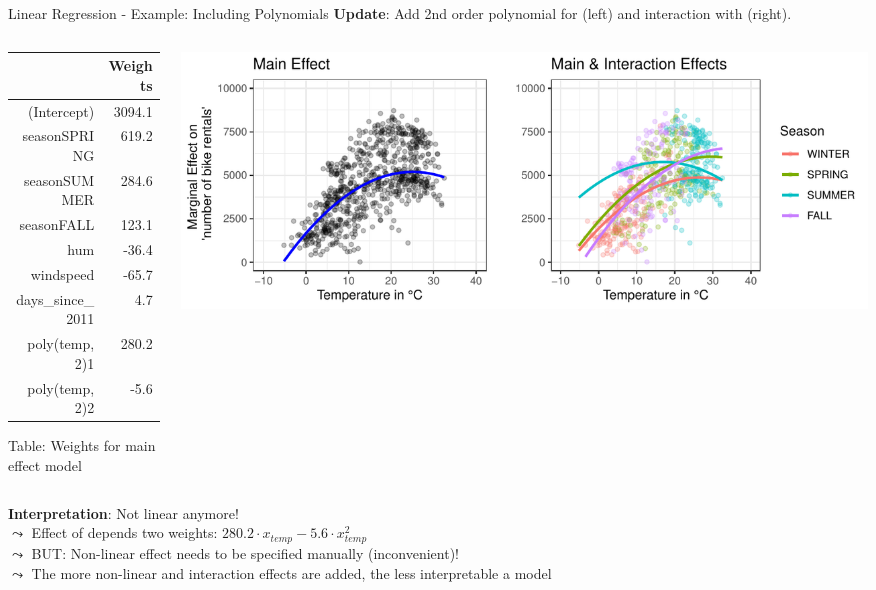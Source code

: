 \documentclass[11pt,compress,t,notes=noshow, aspectratio=169, xcolor=table]{beamer}
\begin{document}
\begin{frame}{Linear Regression - Example: Including Polynomials}
\textbf{Update}: Add 2nd order polynomial for  (left) and interaction with  (right).
\begin{columns}[T]
\begin{column}{0.25\textwidth}
\begin{tiny}
\begin{table}[ht]
\centering
\begin{tabular}{rr}
  \hline
 & Weights \\ 
  \hline
(Intercept) & 3094.1 \\ 
  seasonSPRING & 619.2 \\ 
  seasonSUMMER & 284.6 \\ 
  seasonFALL & 123.1 \\ 
  hum & -36.4 \\ 
  windspeed & -65.7 \\ 
  days\_since\_2011 & 4.7 \\ 
  poly(temp, 2)1 & 280.2 \\ 
  poly(temp, 2)2 & -5.6 \\ 
   \hline
\end{tabular}
\end{table}
   Table: Weights for main effect model

\end{tiny}

\end{column}
\begin{column}{0.7\textwidth}
\includegraphics[width = \textwidth]{figure/poly_main_vs_interaction_effects.pdf}
\end{column}
\end{columns}
\vfill
\pause
\textbf{Interpretation}: Not linear anymore!\\ 
$\leadsto$ Effect of  depends two weights: $280.2 \cdot x_{temp} - 5.6 \cdot x_{temp}^2$\\
$\leadsto$ BUT: Non-linear effect needs to be specified manually (inconvenient)!\\
$\leadsto$ The more non-linear and interaction effects are added, the less interpretable a model
\end{frame}
\end{document}
